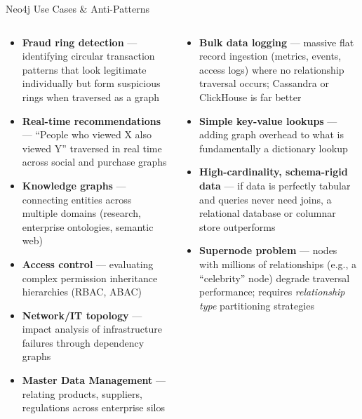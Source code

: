 \documentclass[aspectratio=169]{beamer}
\begin{document}
\begin{frame}{Neo4j Use Cases \& Anti-Patterns}
  \begin{columns}[T]
      \begin{tcolorbox}[neo4jbox, title={[OK] Ideal Use Cases}]
        \small
        \begin{itemize}
          \item \textbf{Fraud ring detection} — identifying circular transaction patterns that look legitimate individually but form suspicious rings when traversed as a graph
          \item \textbf{Real-time recommendations} — ``People who viewed X also viewed Y'' traversed in real time across social and purchase graphs
          \item \textbf{Knowledge graphs} — connecting entities across multiple domains (research, enterprise ontologies, semantic web)
          \item \textbf{Access control} — evaluating complex permission inheritance hierarchies (RBAC, ABAC)
          \item \textbf{Network/IT topology} — impact analysis of infrastructure failures through dependency graphs
          \item \textbf{Master Data Management} — relating products, suppliers, regulations across enterprise silos
        \end{itemize}
      \end{tcolorbox}
      \begin{tcolorbox}[deepdivebox, title={[!] Anti-Patterns}]
        \small
        \begin{itemize}
          \item \textbf{Bulk data logging} — massive flat record ingestion (metrics, events, access logs) where no relationship traversal occurs; Cassandra or ClickHouse is far better
          \item \textbf{Simple key-value lookups} — adding graph overhead to what is fundamentally a dictionary lookup
          \item \textbf{High-cardinality, schema-rigid data} — if data is perfectly tabular and queries never need joins, a relational database or columnar store outperforms
          \item \textbf{Supernode problem} — nodes with millions of relationships (e.g., a ``celebrity'' node) degrade traversal performance; requires \textit{relationship type} partitioning strategies
        \end{itemize}
      \end{tcolorbox}
  \end{columns}
\end{frame}
\end{document}
